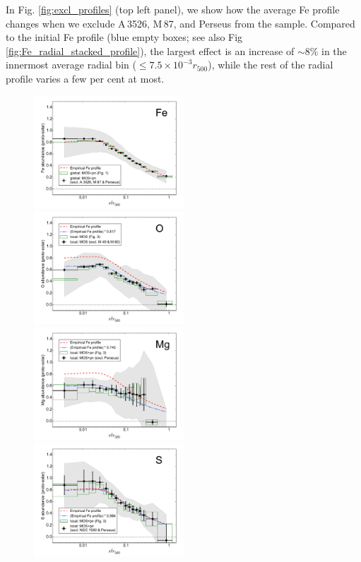 \documentclass{aa}
\begin{document}
In Fig. \ref{fig:excl_profiles} (top left panel), we show how the average Fe profile changes when we exclude A\,3526, M\,87, and Perseus from the sample. Compared to the initial Fe profile (blue empty boxes; see also Fig \ref{fig:Fe_radial_stacked_profile}), the largest effect is an increase of $\sim$8\% in the innermost average radial bin ($\le 7.5 \times 10^{-3} r_{500}$), while the rest of the radial profile varies a few per cent at most.

\begin{figure}[!]

                \includegraphics[width=0.5\textwidth]{fig_radial_stacked_Fe_excl.pdf}
                \includegraphics[width=0.5\textwidth]{fig_radial_stacked_O_excl.pdf} \\
                \includegraphics[width=0.5\textwidth]{fig_radial_stacked_Mg_excl.pdf}
                \includegraphics[width=0.5\textwidth]{fig_radial_stacked_S_excl.pdf}


\end{figure}
\end{document}
